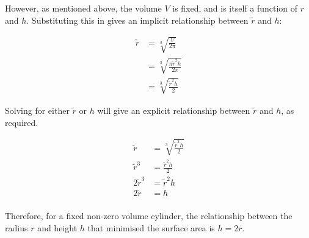 \documentclass[12pt]{article}
\begin{document}
\vspace{5mm}

\begin{mdframed}[linewidth=0.5mm, backgroundcolor=orange!10]
However, as mentioned above, the volume $V$ is fixed, and is itself a function of $r$ and $h$. Substituting this in gives an implicit relationship between $\tilde{r}$ and $h$:
\end{mdframed}


\begin{minipage}[t]{\textwidth}
\begin{mdframed}[linewidth=0.5mm, backgroundcolor=cyan!10]
\begin{align*}
\tilde{r} &= \sqrt[3]{\frac{V}{2\pi}} \\
&= \sqrt[3]{\frac{\pi \tilde{r}^2 h}{2\pi}} \\
&= \sqrt[3]{\frac{\tilde{r}^2 h}{2}}
\end{align*}
\end{mdframed}
\end{minipage}

\vspace{5mm}

\begin{mdframed}[linewidth=0.5mm, backgroundcolor=orange!10]
Solving for either $\tilde{r}$ or $h$ will give an explicit relationship between $\tilde{r}$ and $h$, as required.
\end{mdframed}


\begin{minipage}[t]{\textwidth}
\begin{mdframed}[linewidth=0.5mm, backgroundcolor=cyan!10]
\begin{align*}
\tilde{r} &= \sqrt[3]{\frac{\tilde{r}^2 h}{2}} \\
\tilde{r}^3 &= \frac{\tilde{r}^2 h}{2} \\
2\tilde{r}^3 &= \tilde{r}^2 h \\
2\tilde{r} &= h \\
\end{align*}
\end{mdframed}
\end{minipage}

\vspace{5mm}

\begin{mdframed}[linewidth=0.5mm, backgroundcolor=orange!10]
Therefore, for a fixed non-zero volume cylinder, the relationship between the radius $r$ and height $h$ that minimised the surface area is $h = 2r$.
\end{mdframed}
\end{document}
